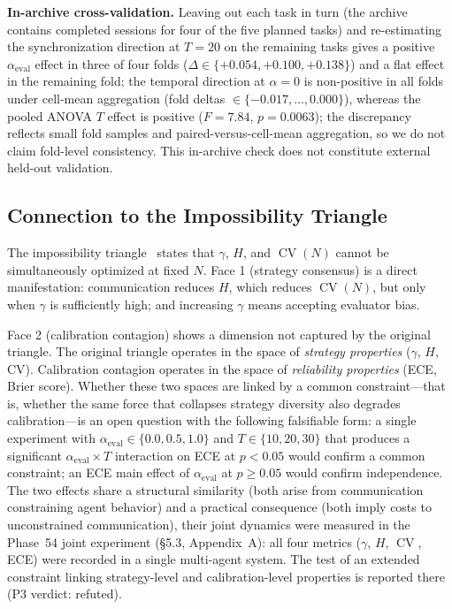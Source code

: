 \documentclass[11pt]{article}
\DeclareMathOperator{\CV}{CV}
\begin{document}
\noindent\textbf{In-archive cross-validation.} Leaving out each task in turn (the archive contains completed sessions for four of the five planned tasks) and re-estimating the synchronization direction at $T{=}20$ on the remaining tasks gives a positive $\alpha_{\text{eval}}$ effect in three of four folds ($\Delta \in \{+0.054, +0.100, +0.138\}$) and a flat effect in the remaining fold; the temporal direction at $\alpha{=}0$ is non-positive in all folds under cell-mean aggregation (fold deltas $\in \{-0.017, \ldots, 0.000\}$), whereas the pooled ANOVA $T$ effect is positive ($F=7.84$, $p=0.0063$); the discrepancy reflects small fold samples and paired-versus-cell-mean aggregation, so we do not claim fold-level consistency. This in-archive check does not constitute external held-out validation.

\subsection{Connection to the Impossibility Triangle}

The impossibility triangle~\cite{liu2026impossible} states that $\gamma$, $H$, and $\CV(N)$ cannot be simultaneously optimized at fixed $N$. Face 1 (strategy consensus) is a direct manifestation: communication reduces $H$, which reduces $\CV(N)$, but only when $\gamma$ is sufficiently high; and increasing $\gamma$ means accepting evaluator bias.

Face 2 (calibration contagion) shows a dimension not captured by the original triangle. The original triangle operates in the space of \textit{strategy properties} ($\gamma$, $H$, CV). Calibration contagion operates in the space of \textit{reliability properties} (ECE, Brier score). Whether these two spaces are linked by a common constraint---that is, whether the same force that collapses strategy diversity also degrades calibration---is an open question with the following falsifiable form: a single experiment with $\alpha_{\text{eval}} \in \{0.0, 0.5, 1.0\}$ and $T \in \{10, 20, 30\}$ that produces a significant $\alpha_{\text{eval}} \times T$ interaction on ECE at $p < 0.05$ would confirm a common constraint; an ECE main effect of $\alpha_{\text{eval}}$ at $p \geq 0.05$ would confirm independence. The two effects share a structural similarity (both arise from communication constraining agent behavior) and a practical consequence (both imply costs to unconstrained communication), their joint dynamics were measured in the Phase~54 joint experiment (§5.3, Appendix~A): all four metrics ($\gamma$, $H$, $\CV$, ECE) were recorded in a single multi-agent system. The test of an extended constraint linking strategy-level and calibration-level properties is reported there (P3 verdict: refuted).
\end{document}
